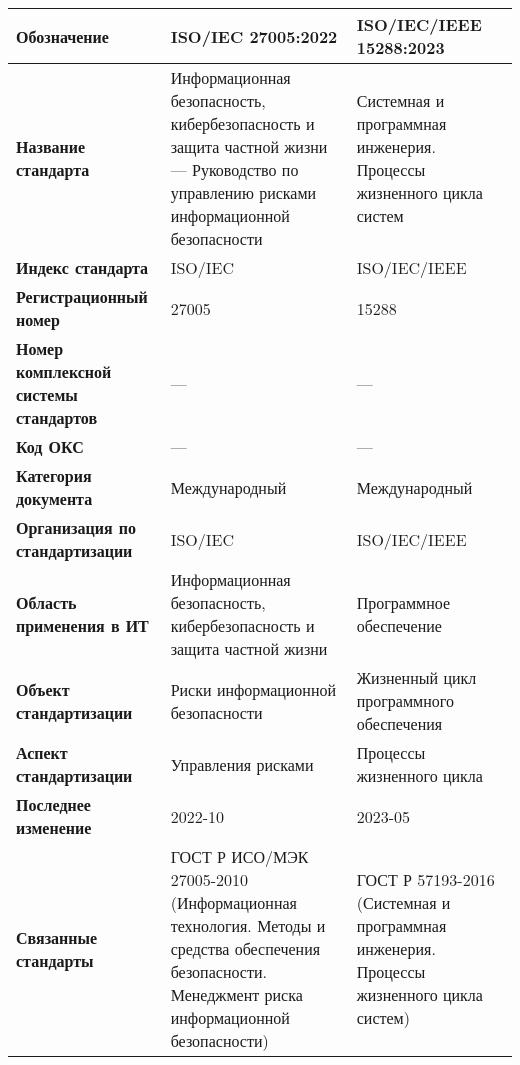 \begin{table}[h!tp]
	\centering
	\caption{}
	\label{table:international}
	\begin{tabular}{|p{10em}|p{11em}|p{11em}|}
		\hline
		\textbf{Обозначение}
			& \textbf{ISO/IEC 27005:2022}
			& \textbf{ISO/IEC/IEEE 15288:2023} \\ \hline
		\textbf{Название стандарта}
			& Информационная безопасность, кибербезопасность
			и защита частной жизни ---
			Руководство по управлению рисками информационной безопасности
			& Системная и программная инженерия.
			Процессы жизненного цикла систем \\ \hline
		\textbf{Индекс стандарта}
			& ISO/IEC & ISO/IEC/IEEE \\ \hline
		\textbf{Регистрационный номер}
			& 27005 & 15288 \\ \hline
		\textbf{Номер комплексной системы стандартов}
			& --- & --- \\ \hline
		\textbf{Код ОКС}
			& --- & --- \\ \hline
		\textbf{Категория документа}
			& Международный & Международный \\ \hline
		\textbf{Организация по стандартизации}
			& ISO/IEC & ISO/IEC/IEEE \\ \hline
		\textbf{Область применения в ИТ}
			& Информационная безопасность, кибербезопасность
			и защита частной жизни
			& Программное обеспечение \\ \hline
		\textbf{Объект стандартизации}
			& Риски информационной безопасности
			& Жизненный цикл программного обеспечения \\ \hline
		\textbf{Аспект стандартизации}
			& Управления рисками
			& Процессы жизненного цикла \\ \hline
		\textbf{Последнее изменение} & 2022-10 & 2023-05 \\ \hline
		\textbf{Связанные стандарты}
			& ГОСТ Р ИСО/МЭК 27005-2010 (Информационная технология.
			Методы и средства обеспечения безопасности.
			Менеджмент риска информационной безопасности)
			& ГОСТ Р 57193-2016 (Системная и программная инженерия.
			Процессы жизненного цикла систем) \\ \hline
	\end{tabular}
\end{table}

